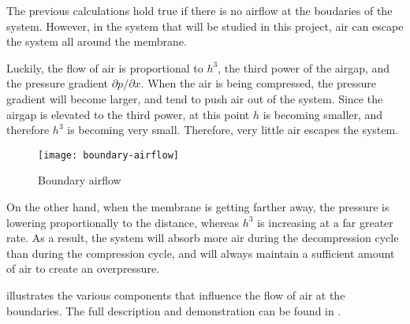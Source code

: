The previous calculations hold true if there is no airflow at the boudaries of
the system. However, in the system that will be studied in this project, air can
escape the system all around the membrane. 

Luckily, the flow of air is proportional to $h^3$, the third power of the
airgap, and the pressure gradient $\partial p / \partial x$. When the air is
being compressed, the pressure gradient will become larger, and tend to push air
out of the system. Since the airgap is elevated to the third power, at this
point $h$ is becoming smaller, and therefore $h^3$ is becoming very small.
Therefore, very little air escapes the system.

\begin{figure}[h]
  \begin{center}
    \texttt{[image: boundary-airflow]}
  \end{center}
  \caption{Boundary airflow\cite{wiesendanger2001}}
  \label{fig:boundary-airflow}
\end{figure}

On the other hand, when the membrane is getting farther away, the pressure is
lowering proportionally to the distance, whereas $h^3$ is increasing at a far
greater rate. As a result, the system will absorb more air during the
decompression cycle than during the compression cycle, and will always maintain
a sufficient amount of air to create an overpressure.

 illustrates the various components that influence the
flow of air at the boundaries. The full description and demonstration can be
found in \cite{wiesendanger2001}.


